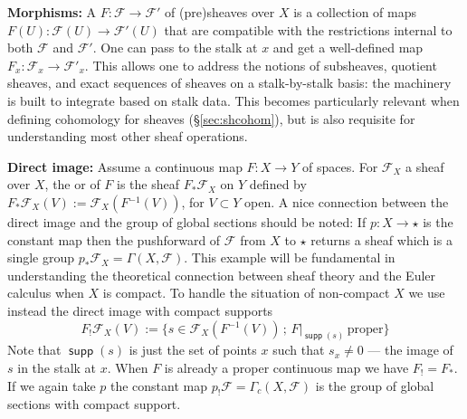 \documentclass{psapm-l}
\theoremstyle{definition}
\theoremstyle{remark}
\numberwithin{equation}{section}
\begin{document}
\vspace{0.1in}
\noindent
{\bf Morphisms:} A {{}} $F\colon{{\mathcal F}}\to{{\mathcal F}}'$ of (pre)sheaves over $X$ is a collection of maps $F(U)\colon{{\mathcal F}}(U)\to{{\mathcal F}}'(U)$ that are compatible with the restrictions internal to both ${{\mathcal F}}$ and ${{\mathcal F}}'$. One can pass to the stalk at $x$ and get a well-defined map $F_x\colon{{\mathcal F}}_x\to{{\mathcal F}}'_x$. This allows one to address the notions of subsheaves, quotient sheaves, and exact sequences of sheaves on a stalk-by-stalk basis: the machinery is built to integrate based on stalk data. This becomes particularly relevant when defining cohomology for sheaves (\S\ref{sec:shcohom}), but is also requisite for understanding most other sheaf operations.

\vspace{0.1in}
\noindent
{\bf Direct image:} Assume a continuous map $F\colon X\to Y$ of spaces. For ${{\mathcal F}}_X$ a sheaf over $X$, the {{}} or {{}} of $F$ is the sheaf $F_*{{\mathcal F}}_X$ on $Y$ defined by $F_*{{\mathcal F}}_X(V) := {{\mathcal F}}_X(F{^{-1}}(V))$, for $V\subset Y$ open. A nice connection between the direct image and the group of global sections should be noted: If $p\colon X\to\star$ is the constant map then the pushforward of ${{\mathcal F}}$ from $X$ to $\star$ returns a sheaf which is a single group $p_*{{\mathcal F}}_X=\Gamma(X,{{\mathcal F}})$. This example will be fundamental in understanding the theoretical connection between sheaf theory and the Euler calculus when $X$ is compact. To handle the situation of non-compact $X$ we use instead the direct image with compact supports
\[
       F_!{{\mathcal F}}_X(V) := \{s\in{{\mathcal F}}_X(F{^{-1}}(V)) \, ; \, F|_{{{{\operatorname{\mathsf{{supp}}}}}}(s)} \, \mathrm{proper}\}
\]
Note that ${{{\operatorname{\mathsf{{supp}}}}}}(s)$ is just the set of points $x$ such that $s_x\neq 0$ --- the image of $s$ in the stalk at $x$. When $F$ is already a proper continuous map we have $F_!=F_*$. If we again take $p$ the constant map $p_!{{\mathcal F}}=\Gamma_c(X,{{\mathcal F}})$ is the group of global sections with compact support.
\end{document}
